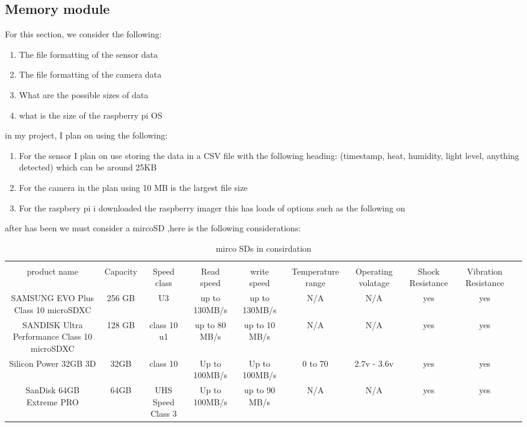 \subsection{Memory module}
For this section, we consider the following:
\begin{enumerate}
	\item The file formatting of the sensor data
	\item The file formatting of  the camera data
	\item What are  the possible sizes of data
	\item what is the size of the  raspberry pi OS
\end{enumerate}
in my project, I plan on using the following:
\begin{enumerate}
	\item For the sensor I plan on use storing the data  in a  CSV file   with the following heading: (timestamp, heat, humidity, light level, anything detected) which can be around 25KB
	\item For the camera in the plan using 10 MB is the  largest file  size
	\item For the raspbery pi i downloaded  the raspberry imager  this has  loads of  options such as  the  following on \pageref{pi os}
\end{enumerate}
after has been we must consider a  mircoSD ,here is the following considerations:
\begin{table}
	\begin{tabular}{|c|c|c|c|c|c|c|c|c|c|}
		\hline \\
		product name & Capacity & Speed class & Read speed & write speed & Temperature range & Operating volatage &Shock Resistance &Vibration Resistance \\
		\hline \hline
		SAMSUNG EVO Plus Class 10 microSDXC& 256 GB &U3&up to 130MB/s&up to 130MB/s&N/A&N/A&yes&yes \\
		SANDISK Ultra Performance Class 10 microSDXC&128 GB& class 10 u1&up to 80 MB/s&up to 10 MB/s&N/A&N/A&yes&yes \\
		Silicon Power 32GB 3D&32GB &class 10&Up to 100MB/s&Up to 100MB/s&0 to 70&2.7v - 3.6v&yes&yes \\
		SanDisk 64GB Extreme PRO&64GB&UHS Speed Class 3&Up to 100MB/s& up to 90 MB/s&N/A&N/A&yes&yes \\

		\hline
	\end{tabular}
	\caption{mirco SDs in consirdation}
	\label{mirco SDs in consirdation}
\end{table}
